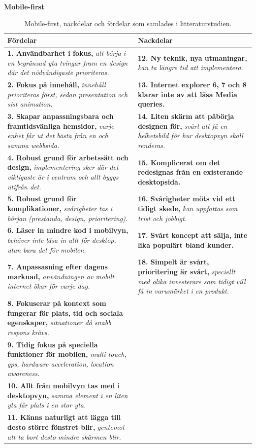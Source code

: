 \documentclass[11pt]{article}
\begin{document}
\textbf{Mobile-first}
\begin{table}[H]
\centering
\begin{tabular}{|p{7.2cm}|p{7.2cm}|}
\hline
Fördelar&Nackdelar\\ \hline
\textbf{1. Användbarhet i fokus, }\textit{att börja i en begränsad yta tvingar fram en design där det nödvändigaste prioriteras.}&\textbf{12. Ny teknik, nya utmaningar,} \textit{kan ta längre tid att implementera.}\\ \hline
\textbf{2. Fokus på innehåll, }\textit{innehåll prioriteras först, sedan presentation och sist animation.}&\textbf{13. Internet explorer 6, 7  och 8 klarar inte av att läsa Media queries.} \\ \hline
\textbf{3. Skapar anpassningsbara och framtidsvänliga hemsidor, }\textit{varje enhet får ut det bästa från en och samma webbsida.}&\textbf{14. Liten skärm att påbörja designen för, } \textit{svårt att få en helhetsbild för hur desktopvyn skall renderas.}\\ \hline
\textbf{4. Robust grund för arbetssätt och design, }\textit{implementering sker där det viktigaste är i centrum och allt byggs utifrån det.}&\textbf{15. Komplicerat om det redesignas från en existerande desktopsida.}\\ \hline
\textbf{5. Robust grund för komplikationer, }\textit{svårigheter tas i början (prestanda, design, prioritering).}&\textbf{16. Svårigheter möts vid ett tidigt skede, } \textit{kan uppfattas som trist och jobbigt.}\\ \hline
\textbf{6. Läser in mindre kod i mobilvyn, }\textit{behöver inte läsa in allt för desktop, utan bara det för mobilen.}&\textbf{17. Svårt koncept att sälja, inte lika populärt bland kunder.}\\ \hline
\textbf{7. Anpassasning efter dagens marknad, }\textit{användningen av mobilt internet ökar för varje dag.}&\textbf{18. Simpelt är svårt, prioritering är svårt, } \textit{speciellt med olika investerare som tidigt vill få in varumärket i en produkt.}\\ \hline
\textbf{8. Fokuserar på kontext som fungerar för plats, tid och sociala egenskaper, }\textit{situationer då snabb respons krävs.}&~\\ \hline
\textbf{9. Tidig fokus på speciella funktioner för mobilen, }\textit{multi-touch, gps, hardware acceleration, location awareness.}&~\\ \hline
\textbf{10. Allt från mobilvyn tas med i desktopvyn, }\textit{samma element i en liten yta får plats i en stor yta.}&~\\ \hline
\textbf{11. Känns naturligt att lägga till desto större fönstret blir, }\textit{gentemot att ta bort desto mindre skärmen blir.}&~\\ \hline

    \end{tabular}
    \caption {Mobile-first, nackdelar och fördelar som samlades i litteraturstudien.}
\end{table}
\newpage
\end{document}

